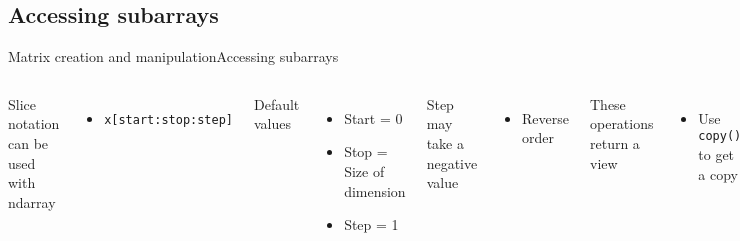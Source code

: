 \documentclass[10pt,compress]{beamer} %
\begin{document}
\subsection{Accessing subarrays}
\begin{frame}[fragile]{Matrix creation and manipulation}{Accessing subarrays}
	\begin{columns}
		Slice notation can be used with ndarray
		\begin{itemize}
			\item \texttt{x[start:stop:step]}
		\end{itemize}
		Default values
		\begin{itemize}
			\item Start = 0
			\item Stop = Size of dimension
			\item Step = 1
		\end{itemize}
		Step may take a negative value
		\begin{itemize}
			\item Reverse order
		\end{itemize}
		These operations return a view 
		\begin{itemize}
			\item Use \texttt{copy()} to get a copy
		\end{itemize}

		\begin{exampleblock}{\footnotesize{Unidimensional array}}
		\vspace{-0.2cm} 
			\begin{lstlisting}
x[:5]   # first five elements
x[5:]   # elements after index 5
x[4:7]  # middle sub-array
x[::2]  # every other element
x[1::2] # every other element, starting at index 1
x[::-1] # all elements, reversed
			\end{lstlisting}
		\vspace{-0.2cm} 
		\end{exampleblock}

		\begin{exampleblock}{\footnotesize{Multidimensional a  rray}}
		\vspace{-0.2cm} 
			\begin{lstlisting}
x[:2, :3]  # 2 rows, 3 columns
x[:3, ::2] # all rows, every other column
x[::-1, ::-1]
			\end{lstlisting}
		\vspace{-0.2cm} 
		\end{exampleblock}
	\end{columns}
\end{frame}
\end{document}
